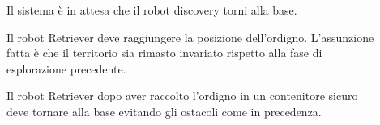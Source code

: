 \begin{description}

  \item[]

  Il sistema è in attesa che il robot discovery torni alla base.

  \item[]

  Il robot Retriever deve raggiungere la posizione dell'ordigno.
  L'assunzione fatta è che il territorio sia rimasto invariato rispetto alla fase di esplorazione precedente.

  \item[]

  Il robot Retriever dopo aver raccolto l'ordigno in un contenitore sicuro deve tornare alla base evitando gli ostacoli come in precedenza.

\end{description}
